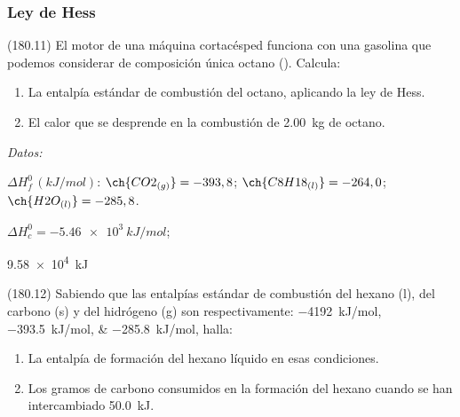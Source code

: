 \documentclass[10pt,a5paper,twoside]{article}
\newenvironment{gexdatos}{
      \vspace{4pt}
      \noindent\small\textit{Datos:}
    }{\vspace{5pt}}
\begin{document}
  \subsubsection*{Ley de Hess}

  \begin{exercise}[
      tags    = {},
      topics  = {química, termodinámica, termoquímica},
      source  = {FQ 1B MGH 2016, p180, e11},
    ]
    (180.11) El motor de una máquina cortacésped funciona con una gasolina que podemos considerar de composición única octano (). Calcula:

    \begin{enumerate}
      \item La entalpía estándar de combustión del octano, aplicando la ley de Hess.
      \item El calor que se desprende en la combustión de \SI{2.00}{\kilo\gram} de octano.
    \end{enumerate}

    \begin{gexdatos}
      \( \Delta H^0_f\,(\si{kJ/mol}) \):
      \( \ch{CO2_{(g)}}   = -393,8 \);
      \( \ch{C8H18_{(l)}} = -264,0 \);
      \( \ch{H2O_{(l)}}   = -285,8 \).
    \end{gexdatos}
  \end{exercise}

  \begin{solution}
    \begin{enumerate*}
      \item \( \Delta H^0_c = \SI{-5.46e3}{kJ/mol} \); \item \SI{9.58e4}{kJ}
    \end{enumerate*}
  \end{solution}




  \begin{exercise}[
      tags    = {},
      topics  = {química, termodinámica, termoquímica},
      source  = {FQ 1B MGH 2016, p180, e12},
    ]
    (180.12) Sabiendo que las entalpías estándar de combustión del
    hexano (l), del carbono (s) y del hidrógeno (g) son respectivamente:
    \SIlist{-4192;-393,5;-285,8}{kJ/mol}, halla:

    \begin{enumerate}
      \item La entalpía de formación del hexano líquido en esas condiciones.
      \item Los gramos de carbono consumidos en la formación del hexano cuando se han intercambiado \SI{50.0}{kJ}.
    \end{enumerate}
  \end{exercise}
\end{document}
